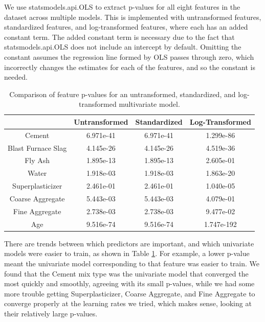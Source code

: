 \documentclass[12pt,letterpaper]{article}
\begin{document}
We use statsmodels.api.OLS to extract p-values for all eight features in the dataset across multiple models. This is implemented with untransformed features, standardized features, and log-transformed features, where each has an added constant term. The added constant term is necessary due to the fact that statsmodels.api.OLS does not include an intercept by default. Omitting the constant assumes the regression line formed by OLS passes through zero, which incorrectly changes the estimates for each of the features, and so the constant is needed.

\begin{table}[h]
    \centering
    \begin{tabular}{cccc}
        \toprule
        & \textbf{Untransformed} & \textbf{Standardized} & \textbf{Log-Transformed} \\
        \midrule
        Cement & 6.971e-41 & 6.971e-41 & 1.299e-86 \\
        Blast Furnace Slag & 4.145e-26 & 4.145e-26 & 4.519e-36 \\
        Fly Ash & 1.895e-13 & 1.895e-13 & 2.605e-01 \\
        Water & 1.918e-03 & 1.918e-03 & 1.863e-20 \\
        Superplasticizer & 2.461e-01 & 2.461e-01 & 1.040e-05 \\
        Coarse Aggregate & 5.443e-03 & 5.443e-03 & 4.079e-01 \\
        Fine Aggregate & 2.738e-03 & 2.738e-03 & 9.477e-02 \\
        Age & 9.516e-74 & 9.516e-74 & 1.747e-192 \\
        \bottomrule
    \end{tabular}
    \caption{Comparison of feature p-values for an untransformed, standardized, and log-transformed multivariate model.}\label{tab:untransformed_vs_standardized_vs_log_transformed_p_feat}
\end{table}

There are trends between which predictors are important, and which univariate models were easier to train, as shown in Table \ref{tab:untransformed_vs_standardized_vs_log_transformed_p_feat}. For example, a lower p-value meant the univariate model corresponding to that feature was easier to train. We found that the Cement mix type was the univariate model that converged the most quickly and smoothly, agreeing with its small p-values, while we had some more trouble getting Superplasticizer, Coarse Aggregate, and Fine Aggregate to converge properly at the learning rates we tried, which makes sense, looking at their relatively large p-values.
\end{document}
